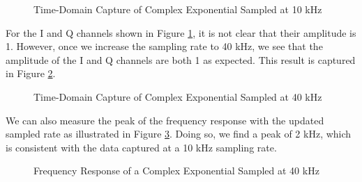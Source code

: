 \documentclass{article}
\begin{document}
\begin{figure}[H]
	\centerline{}
	\caption{Time-Domain Capture of Complex Exponential Sampled at 10 kHz}
	\label{fig::complex_sampling_time_domain_10k_samp_rate}
\end{figure}

For the I and Q channels shown in Figure \ref{fig::complex_sampling_time_domain_10k_samp_rate}, it is not clear that their amplitude is 1. However, once we increase the sampling rate to 40 kHz, we see that the amplitude of the I and Q channels are both 1 as expected. This result is captured in Figure \ref{fig::complex_sampling_time_domain_40k_samp_rate}.

\begin{figure}[H]
	\centerline{}
	\caption{Time-Domain Capture of Complex Exponential Sampled at 40 kHz}
	\label{fig::complex_sampling_time_domain_40k_samp_rate}
\end{figure}

We can also measure the peak of the frequency response with the updated sampled rate as illustrated in Figure \ref{fig::complex_sampling_freq_domain_40k_samp_rate}. Doing so, we find a peak of 2 kHz, which is consistent with the data captured at a 10 kHz sampling rate.

\begin{figure}[H]
	\centerline{}
	\caption{Frequency Response of a Complex Exponential Sampled at 40 kHz}
	\label{fig::complex_sampling_freq_domain_40k_samp_rate}
\end{figure}
\end{document}
